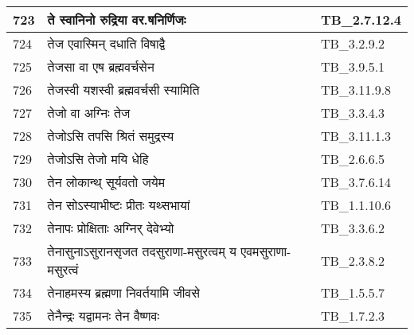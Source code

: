 \documentclass[17pt]{extarticle}
\begin{document}
\begin{longtable}{||p{0.4in}||p{4.9in}||p{0.9in}||}
    \hline
        
    723 & ते स्वानिनो रुद्रिया वर.षनिर्णिजः & TB\_2.7.12.4       \\
    
    \hline
        
    724 & तेज एवास्मिन् दधाति विषाद्वै & TB\_3.2.9.2       \\
    
    \hline
        
    725 & तेजसा वा एष ब्रह्मवर्चसेन & TB\_3.9.5.1       \\
    
    \hline
        
    726 & तेजस्वी यशस्वी ब्रह्मवर्चसी स्यामिति & TB\_3.11.9.8       \\
    
    \hline
        
    727 & तेजो वा अग्निः तेज & TB\_3.3.4.3       \\
    
    \hline
        
    728 & तेजोऽसि तपसि श्रितं समुद्रस्य & TB\_3.11.1.3       \\
    
    \hline
        
    729 & तेजोऽसि तेजो मयि धेहि & TB\_2.6.6.5       \\
    
    \hline
        
    730 & तेन लोकान्थ् सूर्यवतो जयेम & TB\_3.7.6.14       \\
    
    \hline
        
    731 & तेन सोऽस्याभीष्टः प्रीतः यथ्सभायां & TB\_1.1.10.6       \\
    
    \hline
        
    732 & तेनापः प्रोक्षिताः अग्निर् देवेभ्यो & TB\_3.3.6.2       \\
    
    \hline
        
    733 & तेनासुनाऽसुरानसृजत तदसुराणा{-}मसुरत्वम् य एवमसुराणा{-}मसुरत्वं & TB\_2.3.8.2       \\
    
    \hline
        
    734 & तेनाहमस्य ब्रह्मणा निवर्तयामि जीवसे & TB\_1.5.5.7       \\
    
    \hline
        
    735 & तेनैन्द्रः यद्वामनः तेन वैष्णवः & TB\_1.7.2.3       \\
    

\end{longtable}
\end{document}
